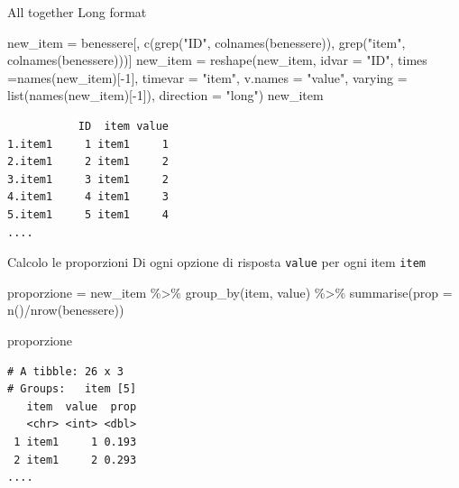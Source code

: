\documentclass[
  ignorenonframetext,
]{beamer}
\newenvironment{Shaded}{\begin{snugshade}}{\end{snugshade}}
\newcommand{\AttributeTok}[1]{\textcolor[rgb]{0.00,0.34,0.68}{#1}}
\newcommand{\DecValTok}[1]{\textcolor[rgb]{0.69,0.50,0.00}{#1}}
\newcommand{\FunctionTok}[1]{\textcolor[rgb]{0.39,0.29,0.61}{#1}}
\newcommand{\NormalTok}[1]{\textcolor[rgb]{0.12,0.11,0.11}{#1}}
\newcommand{\OtherTok}[1]{\textcolor[rgb]{0.00,0.43,0.16}{#1}}
\newcommand{\SpecialCharTok}[1]{\textcolor[rgb]{0.24,0.68,0.91}{#1}}
\newcommand{\StringTok}[1]{\textcolor[rgb]{0.75,0.01,0.01}{#1}}
\begin{document}
\begin{frame}[fragile]{All together}
\protect\hypertarget{all-together}{}
Long format

\footnotesize

\begin{Shaded}
\begin{Highlighting}[]
\NormalTok{new\_item }\OtherTok{=}\NormalTok{ benessere[, }\FunctionTok{c}\NormalTok{(}\FunctionTok{grep}\NormalTok{(}\StringTok{"ID"}\NormalTok{, }\FunctionTok{colnames}\NormalTok{(benessere)), }
                        \FunctionTok{grep}\NormalTok{(}\StringTok{"item"}\NormalTok{, }\FunctionTok{colnames}\NormalTok{(benessere)))]}
\NormalTok{new\_item }\OtherTok{=} \FunctionTok{reshape}\NormalTok{(new\_item, }
        \AttributeTok{idvar =} \StringTok{"ID"}\NormalTok{, }
        \AttributeTok{times =}\FunctionTok{names}\NormalTok{(new\_item)[}\SpecialCharTok{{-}}\DecValTok{1}\NormalTok{], }
        \AttributeTok{timevar =} \StringTok{"item"}\NormalTok{, }\AttributeTok{v.names =} \StringTok{"value"}\NormalTok{,}
        \AttributeTok{varying =} \FunctionTok{list}\NormalTok{(}\FunctionTok{names}\NormalTok{(new\_item)[}\SpecialCharTok{{-}}\DecValTok{1}\NormalTok{]), }
        \AttributeTok{direction =} \StringTok{"long"}\NormalTok{)}
\NormalTok{new\_item}
\end{Highlighting}
\end{Shaded}

\begin{verbatim}
           ID  item value
1.item1     1 item1     1
2.item1     2 item1     2
3.item1     3 item1     2
4.item1     4 item1     3
5.item1     5 item1     4
....
\end{verbatim}
\end{frame}

\begin{frame}[fragile]{Calcolo le proporzioni}
\protect\hypertarget{calcolo-le-proporzioni}{}
Di ogni opzione di risposta \texttt{value} per ogni item \texttt{item}

\begin{Shaded}
\begin{Highlighting}[]
\NormalTok{proporzione }\OtherTok{=}\NormalTok{ new\_item }\SpecialCharTok{\%\textgreater{}\%} 
  \FunctionTok{group\_by}\NormalTok{(item, value) }\SpecialCharTok{\%\textgreater{}\%} 
  \FunctionTok{summarise}\NormalTok{(}\AttributeTok{prop =} \FunctionTok{n}\NormalTok{()}\SpecialCharTok{/}\FunctionTok{nrow}\NormalTok{(benessere))}

\NormalTok{proporzione}
\end{Highlighting}
\end{Shaded}

\begin{verbatim}
# A tibble: 26 x 3
# Groups:   item [5]
   item  value  prop
   <chr> <int> <dbl>
 1 item1     1 0.193
 2 item1     2 0.293
....
\end{verbatim}
\end{frame}
\end{document}
